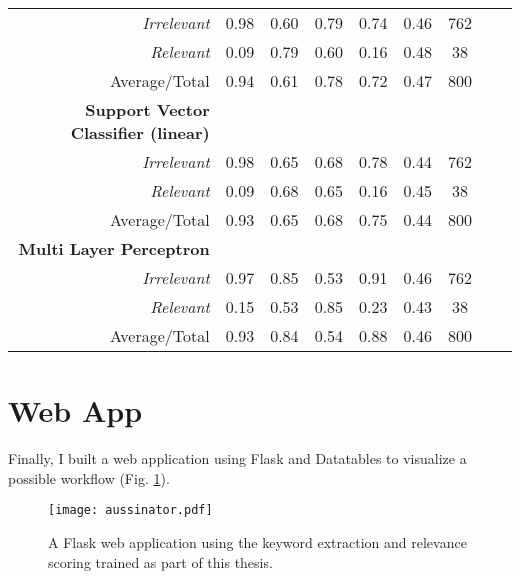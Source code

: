 \begin{table}
\begin{tabular}{@{}rcccccccc@{}}
    \emph{Irrelevant}& 0.98& 0.60&  0.79& 0.74& 0.46& 762 \\
    \emph{Relevant}& 0.09& 0.79&  0.60& 0.16& 0.48& 38 \\
    Average/Total& 0.94& 0.61& 0.78& 0.72& 0.47& 800 \vspace{2mm}\\
    \textbf{Support Vector Classifier (linear)}\\
    \emph{Irrelevant}& 0.98& 0.65&  0.68& 0.78& 0.44& 762 \\
    \emph{Relevant}& 0.09& 0.68&  0.65& 0.16& 0.45& 38 \\
    Average/Total& 0.93& 0.65& 0.68& 0.75& 0.44& 800 \vspace{2mm}\\
    \textbf{Multi Layer Perceptron}\\
    \emph{Irrelevant}& 0.97& 0.85&  0.53& 0.91& 0.46& 762 \\
    \emph{Relevant}& 0.15& 0.53&  0.85& 0.23& 0.43& 38 \\
    Average/Total& 0.93& 0.84& 0.54& 0.88& 0.46& 800 \\
    \bottomrule
  \end{tabular}
  \label{table:recommender_performance}
\end{table}

\section{Web App}
Finally, I built a web application using Flask and Datatables to visualize a possible workflow (Fig. \ref{fig:t-aussinator}).

\begin{figure}[h!]
    \centering
    \texttt{[image: aussinator.pdf]}
    \caption{A Flask web application using the keyword extraction and relevance scoring trained as part of this thesis.}
    \label{fig:t-aussinator}
\end{figure}
